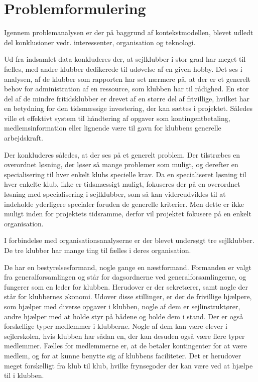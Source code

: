 \chapter{Problemformulering}\label{chap:problemformulering}


Igennem problemanalysen er der på baggrund af kontekstmodellen, blevet udledt del konklusioner vedr. interessenter, organisation og teknologi.

Ud fra indsamlet data konkluderes der, at sejlklubber i stor grad har meget til fælles, med andre klubber dedikerede til udøvelse af en given hobby. Det ses i analysen, af de klubber som rapporten har set nærmere på, at der er et generelt behov for administration af en ressource, som klubben har til rådighed. En stor del af de mindre fritidsklubber er drevet af en større del af frivillige, hvilket har en betydning for den tidsmæssige investering, der kan sættes i projektet. Således ville et effektivt system til håndtering af opgaver som kontingentbetaling, medlemsinformation eller lignende være til gavn for klubbens generelle arbejdskraft.

Der konkluderes således, at der ses på et generelt problem. Der tilstræbes en overordnet løsning, der løser så mange problemer som muligt, og derefter en specialisering til hver enkelt klubs specielle krav. Da en specialiseret løsning til hver enkelte klub, ikke er tidsmæssigt muligt, fokuseres der på en overordnet løsning med specialisering i sejlklubber, som så kan videreudvikles til at indeholde yderligere specialer foruden de generelle kriterier. Men dette er ikke muligt inden for projektets tidsramme, derfor vil projektet fokusere på en enkelt organisation. 

I forbindelse med organisationsanalyserne er der blevet undersøgt tre sejlklubber. De tre klubber har mange ting til fælles i deres organisation.

De har en bestyrelsesformand, nogle gange en næstformand. Formanden er valgt fra generalforsamlingen og står for
dagsordnerne ved generalforsamlingerne, og fungerer som en leder for klubben. Herudover er der sekretærer, samt nogle
der står for klubbernes økonomi. Udover disse stillinger, er der de frivillige hjælpere, som hjælper med diverse opgaver
i klubben, nogle af dem er sejlinstruktører, andre hjælper med at holde styr på bådene og holde dem i stand. Der er også
forskellige typer medlemmer i klubberne. Nogle af dem kan være elever i sejlerskolen, hvis klubben har sådan en, der kan
desuden også være flere typer medlemmer. Fælles for medlemmerne er, at de betaler kontingenter for at være medlem, og for
at kunne benytte sig af klubbens faciliteter. Det er herudover meget forskelligt fra klub til klub, hvilke frynsegoder
der kan være ved at hjælpe til i klubben.

